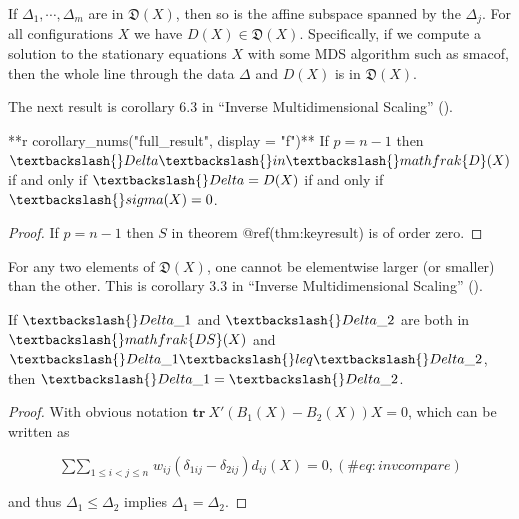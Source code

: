 \documentclass[
  12pt,
  letterpaper,
  DIV=11,
  numbers=noendperiod]{scrreprt}
\newenvironment{Shaded}{\begin{snugshade}}{\end{snugshade}}
\newcommand{\NormalTok}[1]{\textcolor[rgb]{0.00,0.23,0.31}{#1}}
\theoremstyle{remark}
\begin{document}
If \(\Delta_1,\cdots,\Delta_m\) are in \(\mathfrak{D}(X)\), then so is
the affine subspace spanned by the \(\Delta_j\). For all configurations
\(X\) we have \(D(X)\in\mathfrak{D}(X)\). Specifically, if we compute a
solution to the stationary equations \(X\) with some MDS algorithm such
as smacof, then the whole line through the data \(\Delta\) and \(D(X)\)
is in \(\mathfrak{D}(X)\).

The next result is corollary 6.3 in {``{Inverse Multidimensional
Scaling}''} ().

\begin{Shaded}
\begin{Highlighting}[]
\NormalTok{**\textasciigrave{}r corollary\_nums("full\_result", display = "f")\textasciigrave{}** If $p=n{-}1$ then $\textbackslash{}Delta\textbackslash{}in\textbackslash{}mathfrak\{D\}(X)$ if and only if $\textbackslash{}Delta=D(X)$ if and only if $\textbackslash{}sigma(X)=0$.}
\end{Highlighting}
\end{Shaded}

\begin{proof}
If \(p=n-1\) then \(S\) in theorem @ref(thm:keyresult) is of order zero.
\end{proof}

For any two elements of \(\mathfrak{D}(X)\), one cannot be elementwise
larger (or smaller) than the other. This is corollary 3.3 in {``{Inverse
Multidimensional Scaling}''}
().

\begin{Shaded}
\begin{Highlighting}[]
\NormalTok{If $\textbackslash{}Delta\_1$ and $\textbackslash{}Delta\_2$ are both in $\textbackslash{}mathfrak\{DS\}(X)$ and $\textbackslash{}Delta\_1\textbackslash{}leq\textbackslash{}Delta\_2$, then $\textbackslash{}Delta\_1=\textbackslash{}Delta\_2$.}
\end{Highlighting}
\end{Shaded}

\begin{proof}
With obvious notation \(\mathbf{tr}\ X'(B_1(X)-B_2(X))X=0\), which can
be written as

\begin{equation}
\mathop{\sum\sum}_{1\leq i<j\leq n} w_{ij}\left(\delta_{1ij}-\delta_{2ij}\right)d_{ij}(X)=0,
(\#eq:invcompare)
\end{equation}

and thus \(\Delta_1\leq\Delta_2\) implies \(\Delta_1=\Delta_2\).
\end{proof}
\end{document}
